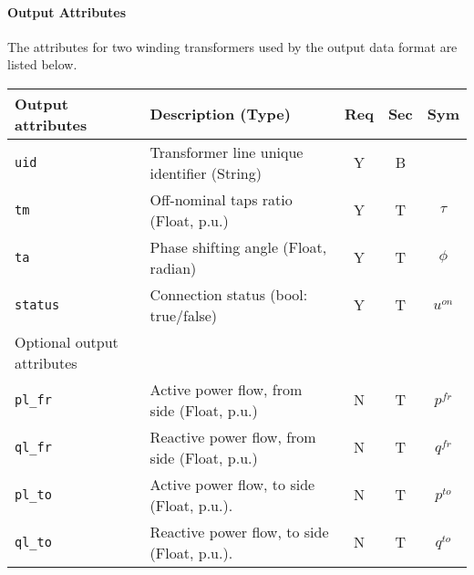 \documentclass{article}
\begin{document}



\paragraph{Output Attributes}
The attributes for two winding transformers used by the output data format are listed below.
\begin{center}
\small
\begin{tabular}{ l | l | c | c | c |}
Output attributes & Description (Type)& Req & Sec & Sym\\
\hline
 {\tt uid} & Transformer line unique identifier (String)& Y & B & \\
 {\tt tm} & Off-nominal taps ratio (Float, p.u.)& Y & T & $\tau$\\
 {\tt ta} & Phase shifting angle (Float, radian)& Y & T & $\phi$\\
 {\tt status}     & Connection status (bool: true/false) & Y & T & $u^{on}$ \\ 
\hline
  Optional output attributes &   &  & & \\
\hline
 {\tt pl\_fr} & Active power flow, from side (Float, p.u.)  & N & T & $p^{fr}$ \\
 {\tt ql\_fr} & Reactive power flow, from side (Float, p.u.)& N & T & $q^{fr}$ \\
 {\tt pl\_to} & Active power flow, to side (Float, p.u.).   & N & T & $p^{to}$ \\
 {\tt ql\_to} & Reactive power flow, to side (Float, p.u.). & N & T & $q^{to}$ \\
\hline 
\end{tabular}
\end{center}
\end{document}
